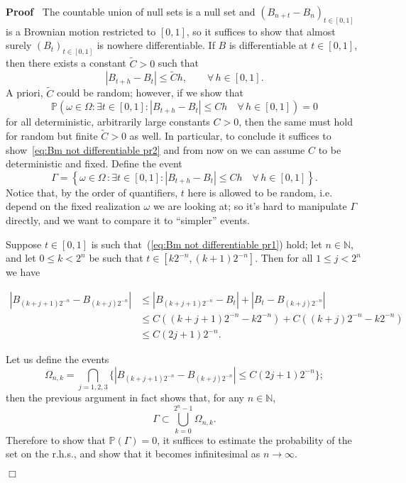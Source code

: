\documentclass{article}
\newenvironment{proof}{\noindent\textbf{Proof\ }}{\hspace*{\fill}$\Box$\medskip}
\newcommand{\1}{\mathbbm{1}}
\begin{document}
\begin{proof}
  The countable union of null sets is a null set and $(B_{n + t} - B_n)_{t \in
  [0, 1]}$ is a Brownian motion restricted to $[0, 1]$, so it suffices to show
  that almost surely $(B_t)_{t \in [0, 1]}$ is nowhere differentiable. If $B$
  is differentiable at $t \in [0, 1]$, then there exists a constant $\tilde{C}
  > 0$ such that
  \begin{equation}
    \label{eq:Bm not differentiable pr1} |B_{t + h} - B_t | \leqslant
    \tilde{C} h, \qquad \forall \, h \in [0, 1] .
  \end{equation}
  A priori, $\tilde{C}$ could be random; however, if we show that
  \begin{equation}
    \mathbb{P} \left( \omega \in \Omega : \exists t \in [0, 1] : |B_{t + h} -
    B_t | \leqslant C h \quad \forall \, h \in [0, 1] \right) = 0 \label{eq:Bm
    not differentiable pr2}
  \end{equation}
  for all deterministic, arbitrarily large constants $C > 0$, then the same
  must hold for random but finite $\tilde{C} > 0$ as well. In particular, to
  conclude it suffices to show~\eqref{eq:Bm not differentiable pr2} and from
  now on we can assume $C$ to be deterministic and fixed. Define the event
  \[ \Gamma = \left\{ \omega \in \Omega \, : \exists t \in [0, 1] : |B_{t + h}
     - B_t | \leqslant C h \quad \forall \, h \in [0, 1] \right\} . \]
  Notice that, by the order of quantifiers, $t$ here is allowed to be random,
  i.e. depend on the fixed realization $\omega$ we are looking at; so it's
  hard to manipulate $\Gamma$ directly, and we want to compare it to
  ``simpler'' events.

  Suppose $t \in [0, 1]$ is such that~(\ref{eq:Bm not differentiable pr1})
  hold; let $n \in \mathbb{N}$, and let $0 \leqslant k < 2^n$ be such that $t
  \in [k 2^{- n}, (k + 1) 2^{- n}]$. Then for all $1 \leqslant j < 2^n$ we
  have

  \begin{align*}
    |B_{(k + j + 1) 2^{- n}} - B_{(k + j) 2^{- n}} | & \leqslant |B_{(k + j +
    1) 2^{- n}} - B_t | + |B_t - B_{(k + j) 2^{- n}} |\\
    & \leqslant C ( (k + j + 1) 2^{- n} - k 2^{- n}) + C ((k + j) 2^{- n} - k
    2^{- n})\\
    & \leqslant C (2 j + 1) 2^{- n} .
  \end{align*}

  Let us define the events
  \[ \Omega_{n, k} = \bigcap_{j = 1, 2, 3} \{ |B_{(k + j + 1) 2^{- n}} - B_{(k
     + j) 2^{- n}} | \leqslant C (2 j + 1) 2^{- n} \} ; \]
  then the previous argument in fact shows that, for any $n \in \mathbb{N}$,
  \[ \Gamma \subset \bigcup_{k = 0}^{2^n - 1} \Omega_{n, k} . \]
  Therefore to show that $\mathbb{P} (\Gamma) = 0$, it suffices to estimate
  the probability of the set on the r.h.s., and show that it becomes
  infinitesimal as $n \rightarrow \infty$.


\end{proof}
\end{document}
